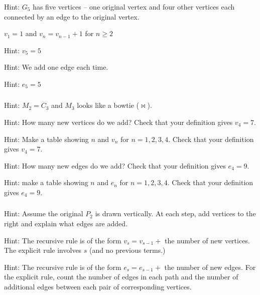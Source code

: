 \subsubsection*{ \answers}
\begin{apart}
    \item Hint: $G_5$ has five vertices -- one original vertex and four other vertices each connected by an edge to the original vertex.
    \item $v_1=1$ and $v_n=v_{n-1}+1$ for $n\ge 2$
    \item Hint: $v_5=5$
    \item Hint: We add one edge each time.
    \item Hint: $e_5=5$
\end{apart}

\subsubsection*{ \answers}
\begin{apart}
    \item Hint: $M_2=C_3$ and $M_3$ looks like a bowtie ($\bowtie$).
    \item Hint: How many new vertices do we add? Check that your definition gives $v_4 = 7$.
    \item Hint: Make a table showing $n$ and $v_n$ for $n=1,2,3,4$. Check that your definition gives $v_4 = 7$.
    \item Hint: How many new edges do we add?  Check that your definition gives $e_4=9$.
    \item Hint: make a table showing $n$ and $e_n$ for $n=1,2,3,4$. Check that your definition gives $e_4=9$.
\end{apart}

\subsubsection*{ \answers}
\begin{apart}
    \item Hint: Assume the original $P_2$ is drawn vertically.  At each step, add vertices to the right and explain what edges are added.
    \item Hint: The recursive rule is of the form $v_s = v_{s-1} + $ the number of new vertices.  The explicit rule involves $s$ (and no previous terms.)
    \item Hint: The recursive rule is of the form $e_s = e_{s-1} +$ the number of new edges.  For the explicit rule, count the number of edges in each path and the number of additional edges between each pair of corresponding vertices.
\end{apart}

